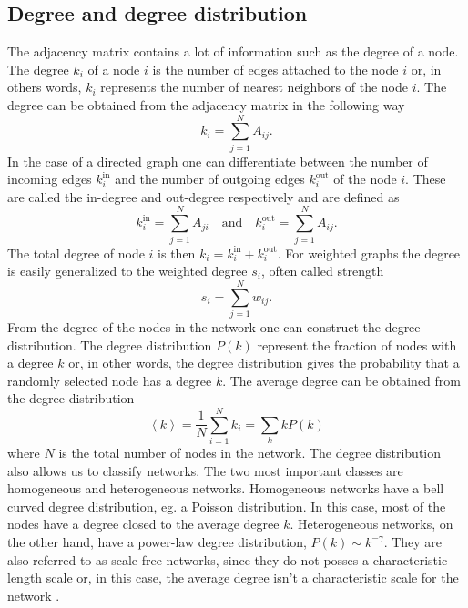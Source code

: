 \documentclass[11 pt , letterpaper , twoside , openright]{book}
\begin{document}
\subsection{Degree and degree distribution}

The adjacency matrix contains a lot of information such as the degree of a node. The degree $k_i$ of a node $i$ is the number of edges attached to the node $i$ or, in others words, $k_i$ represents the number of nearest neighbors of the node $i$. The degree can be obtained from the adjacency matrix in the following way \cite{Mata2020}
\begin{equation}
	k_i = \sum_{j=1}^N A_{ij}.
\end{equation}
In the case of a directed graph one can differentiate between the number of incoming edges $k_i^{\text{in}}$ and the number of outgoing edges $k_i^{\text{out}}$ of the node $i$. These are called the in-degree and out-degree respectively and are defined as \cite{Mata2020}
\begin{equation}
	k_i^{\text{in}} = \sum_{j=1}^N A_{ji} \quad \text{and} \quad k_i^{\text{out}} = \sum_{j=1}^N A_{ij}.
\end{equation}
The total degree of node $i$ is then $k_i = k_i^{\text{in}} + k_i^{\text{out}}$. For weighted graphs the degree is easily generalized to the weighted degree $s_i$, often called strength \cite{Ioannis2007}
\begin{equation}
	s_i = \sum_{j=1}^N w_{ij}.
\end{equation}
From the degree of the nodes in the network one can construct the degree distribution. The degree distribution $P(k)$ represent the fraction of nodes with a degree $k$ or, in other words, the degree distribution gives the probability that a randomly selected node has a degree $k$. The average degree can be obtained from the degree distribution \cite{Mata2020}
\begin{equation}
	\left<k\right> = \frac{1}{N} \sum_{i=1}^N k_i = \sum_k k P(k)
\end{equation}
where $N$ is the total number of nodes in the network. The degree distribution also allows us to classify networks. The two most important classes are homogeneous and heterogeneous networks. Homogeneous networks have a bell curved degree distribution, eg. a Poisson distribution. In this case, most of the nodes have a degree closed to the average degree $k$. Heterogeneous networks, on the other hand, have a power-law degree distribution, $P(k) \sim k^{-\gamma}$. %
They are also referred to as scale-free networks, since they do not posses a characteristic length scale or, in this case, the average degree isn't a characteristic scale for the network \cite{Mata2020}. %
\end{document}

